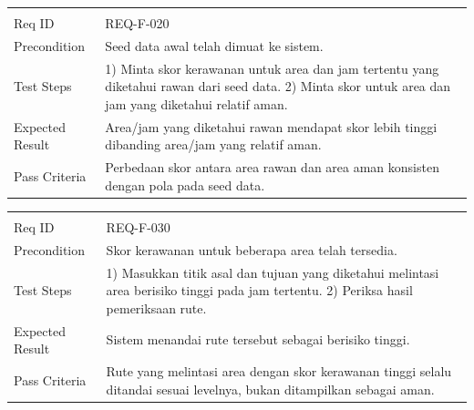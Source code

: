 \documentclass[11pt,a4paper]{article}
\begin{document}
\begin{longtable}{|L{2.6cm}|L{11.4cm}|}
\hline
{} \\ \hline
\endfirsthead
\hline
{} \\ \hline
\endhead
Req ID & REQ-F-020 \\ \hline
Precondition & Seed data awal telah dimuat ke sistem. \\ \hline
Test Steps & 1) Minta skor kerawanan untuk area dan jam tertentu yang diketahui rawan dari seed data. 2) Minta skor untuk area dan jam yang diketahui relatif aman. \\ \hline
Expected Result & Area/jam yang diketahui rawan mendapat skor lebih tinggi dibanding area/jam yang relatif aman. \\ \hline
Pass Criteria & Perbedaan skor antara area rawan dan area aman konsisten dengan pola pada seed data. \\ \hline
\end{longtable}

\begin{longtable}{|L{2.6cm}|L{11.4cm}|}
\hline
{} \\ \hline
\endfirsthead
\hline
{} \\ \hline
\endhead
Req ID & REQ-F-030 \\ \hline
Precondition & Skor kerawanan untuk beberapa area telah tersedia. \\ \hline
Test Steps & 1) Masukkan titik asal dan tujuan yang diketahui melintasi area berisiko tinggi pada jam tertentu. 2) Periksa hasil pemeriksaan rute. \\ \hline
Expected Result & Sistem menandai rute tersebut sebagai berisiko tinggi. \\ \hline
Pass Criteria & Rute yang melintasi area dengan skor kerawanan tinggi selalu ditandai sesuai levelnya, bukan ditampilkan sebagai aman. \\ \hline
\end{longtable}
\end{document}
